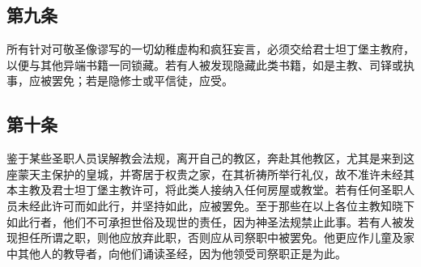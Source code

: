 \par


\subsection{第九条}

\par

所有针对可敬圣像谬写的一切幼稚虚构和疯狂妄言，必须交给君士坦丁堡主教府，以便与其他异端书籍一同锁藏。若有人被发现隐藏此类书籍，如是主教、司铎或执事，应被罢免；若是隐修士或平信徒，应受。\par

\par


\subsection{第十条}

\par

鉴于某些圣职人员误解教会法规，离开自己的教区，奔赴其他教区，尤其是来到这座蒙天主保护的皇城，并寄居于权贵之家，在其祈祷所举行礼仪，故不准许未经其本主教及君士坦丁堡主教许可，将此类人接纳入任何房屋或教堂。若有任何圣职人员未经此许可而如此行，并坚持如此，应被罢免。至于那些在以上各位主教知晓下如此行者，他们不可承担世俗及现世的责任，因为神圣法规禁止此事。若有人被发现担任所谓之职，则他应放弃此职，否则应从司祭职中被罢免。他更应作儿童及家中其他人的教导者，向他们诵读圣经，因为他领受司祭职正是为此。\par

\par



